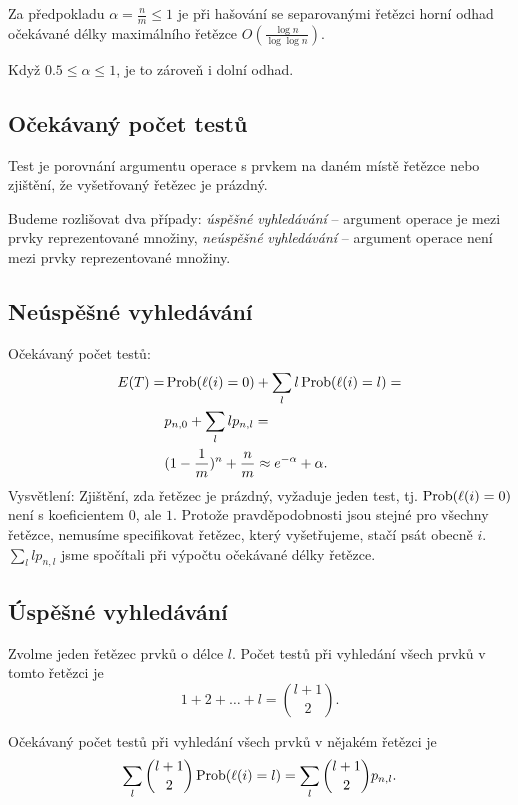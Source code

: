 \documentclass[a4paper,12pt]{article}
\begin{document}
\begin{veta}Za předpokladu $\alpha =\frac nm\le 1$ je při hašování 
se se\-parovanými řetězci horní odhad očekávané délky 
maximálního ře\-těz\-ce $O(\frac {\log n}{\log\log n}
)$.  

Když $0.5\le\alpha\le 1$, je to zároveň i dolní odhad.
\end{veta}

\subsection{
Očekávaný počet testů
}

Test je porovnání argumentu operace s 
prvkem na daném místě řetězce nebo zjiště\-ní, 
že vyšetřovaný řetězec je prázdný.

Budeme rozlišovat dva případy:\newline 
\phantom{---}\emph{úspěšné} \emph{vyhledávání} -- argument 
operace je mezi prvky reprezentované množiny,\newline 
\phantom{---}\emph{neúspěšné} \emph{vyhledávání} -- argument 
operace není mezi prv\-ky reprezentované mno\-žiny.

\subsection{
Neúspěšné vyhledávání
}

Očekávaný počet testů:
\begin{align*} E(T)=&\operatorname{Prob}(\ell (i)=0)+\sum_ll\operatorname{Prob}(\ell (i)=l)=\\
&p_{n,0}+\sum_llp_{n,l}=\\
&(1-\frac 1m)^n+\frac nm\approx e^{-\alpha}+\alpha .\end{align*}
Vysvětlení: Zjištění, zda řetězec je prázdný, vyžaduje 
jeden test, tj. $\operatorname{Prob}(\ell (i)=0)$ není s koeficientem $0$, ale $
1$.
Protože pravděpodobnosti jsou stejné pro všechny 
řetězce, nemusíme specifikovat řetězec, který 
vyšetřujeme, stačí psát obecně $i$. $\sum_llp_{
n,l}$ jsme spočítali 
při výpočtu očekávané délky řetězce.

\subsection{
\'Uspěšné vyhledávání
}

Zvolme jeden řetězec prvků o délce $l$. 
Počet testů při vyhledání všech prvků 
v tomto řetězci je
$$1+2+\dots+l=\binom {l+1}2.$$

Očekávaný počet testů při vyhledání všech 
prvků v nějakém řetězci je 
$$\sum_l\binom {l+1}2\operatorname{Prob}(\ell (i)=l)=\sum_l\binom {l+1}2p_{n,l}
.$$
\end{document}
